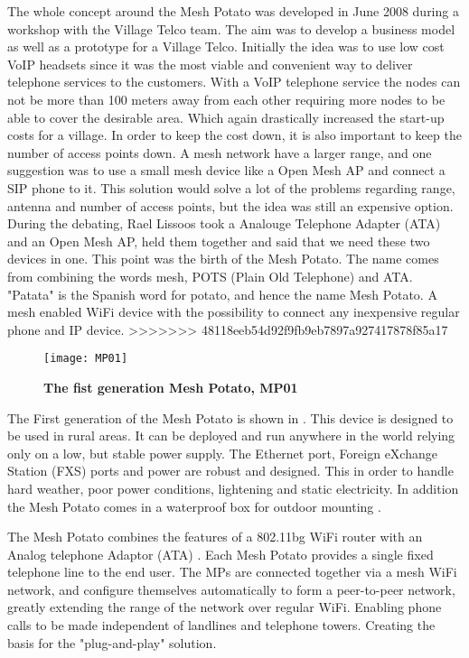 The whole concept around the Mesh Potato was developed in June 2008 during a workshop with the Village Telco team. The aim was to develop a business model as well as a prototype for a Village Telco. Initially the idea was to use low cost VoIP headsets since it was the most viable and convenient way to deliver telephone services to the customers. With a VoIP telephone service the nodes can not be more than 100 meters away from each other requiring more nodes to be able to cover the desirable area. Which again drastically increased the start-up costs for a village. In order to keep the cost down, it is also important to keep the number of access points down. A mesh network have a larger range, and one suggestion was to use a small mesh device like a Open Mesh AP and connect a SIP phone to it. This solution would solve a lot of the problems regarding range, antenna and number of access points, but the idea was still an expensive option. During the debating, Rael Lissoos took a Analouge Telephone Adapter (ATA) and an Open Mesh AP, held them together and said that we need these two devices in one. This point was the birth of the Mesh Potato. The name comes from combining the words mesh, POTS (Plain Old Telephone) and ATA. "Patata" is the Spanish word for potato, and hence the name Mesh Potato. A mesh enabled WiFi device with the possibility to connect any inexpensive regular phone and IP device. \cite{MPorigin}
>>>>>>> 48118eeb54d92f9fb9eb7897a927417878f85a17

\begin{figure}[h!]
  \centering
      \texttt{[image: MP01]}
  \caption [The Mesh Potato]{\textbf{The fist generation Mesh Potato, MP01}}
  \label{fig:MP01}
\end{figure}

The First generation of the Mesh Potato is shown in . This device is designed to be used in rural areas. It can be deployed and run anywhere in the world relying only on a low, but stable power supply. The Ethernet port, Foreign eXchange Station (FXS) ports and power are robust and designed. This in order to handle hard weather, poor power conditions, lightening and static electricity. In addition the Mesh Potato comes in a waterproof box for outdoor mounting \cite{background}.

The Mesh Potato combines the features of a 802.11bg WiFi router with an Analog telephone Adaptor (ATA) \cite{MP}. Each Mesh Potato provides a single fixed telephone line to the end user. The MPs are connected together via a mesh WiFi network, and  configure themselves automatically to form a peer-to-peer network, greatly extending the range of the network over regular WiFi. Enabling phone calls to be made independent of landlines and telephone towers. Creating the basis for the "plug-and-play" solution. 









